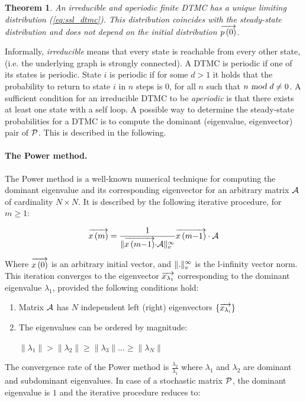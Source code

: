 \documentclass[a4paper,11pt]{article}
\newtheorem{theorem}{Theorem}
\begin{document}
		\begin{theorem}
			An irreducible and aperiodic finite DTMC has a unique limiting distribution (\ref{eq:ssl_dtmc}).  This distribution coincides with the steady-state distribution and does not depend on the initial distribution $\overrightarrow{p \left( 0 \right)}$.
		\end{theorem}
		
		Informally, \emph{irreducible} means that every state is reachable from every other state, (i.e. the underlying graph is strongly connected).  A DTMC is periodic if one of its states is periodic.  State $i$ is periodic if for some $d > 1$ it holds that the probability to return to state $i$ in $n$ steps is 0, for all $n$ such that $n \mbox{ \sl mod } d \neq 0$.  A sufficient condition for an irreducible DTMC to be \emph{aperiodic} is that there exists at least one state with a self loop. A possible way to determine the steady-state probabilities for a DTMC is to compute the dominant (eigenvalue, eigenvector) pair of $\mathcal{P}$.  This is described in the following.
		
		\paragraph{The Power method. \label{sss:power_method}}
		The Power method \cite{Stewart_94} is a well-known numerical technique for computing the dominant eigenvalue and its corresponding eigenvector for an arbitrary matrix $\mathcal{A}$  of cardinality $N \times N$.  It is described by the following iterative procedure, for $m \geq 1$:
		
		\begin{equation}
			\overrightarrow{x\left(m\right)}	= \frac{1}{ \lVert   \overrightarrow{x\left(m{-}1\right)}{\cdot}\mathcal{A}   \rVert_{v}^{\infty} }\overrightarrow{x\left(m{-}1\right)} \cdot \mathcal{A}
		\end{equation}
		
		Where $\overrightarrow{x\left(0\right)}$ is an arbitrary initial vector, and $\lVert  .  \rVert_{v}^{\infty}$ is the l-infinity vector norm. This iteration converges to the eigenvector $\overrightarrow{x_{\lambda_{1}}}$ corresponding to the dominant eigenvalue $\lambda_{1}$, provided the following conditions hold:

		\begin{enumerate}
			\item Matrix $\mathcal{A}$ has $N$ independent left (right) eigenvectors $\left\lbrace \overrightarrow{x_{\lambda_{i}}} \right\rbrace $
			\item The eigenvalues can be ordered by magnitude: 
					\begin{center}
						$\left\| \lambda_{1} \right\| > \left\| \lambda_{2} \right\| \geq \left\| \lambda_{3} \right\| \ldots \geq \left\| \lambda_{N} \right\|$
					\end{center}
		\end{enumerate}
		The convergence rate of the Power method is $\frac{\lambda_{2}}{\lambda_{1}}$ where  $\lambda_{1}$ and $\lambda_{2}$ are dominant and subdominant eigenvalues.
In case of a stochastic matrix $\mathcal{P}$, the dominant eigenvalue is $1$ and the iterative procedure reduces to:
\end{document}
